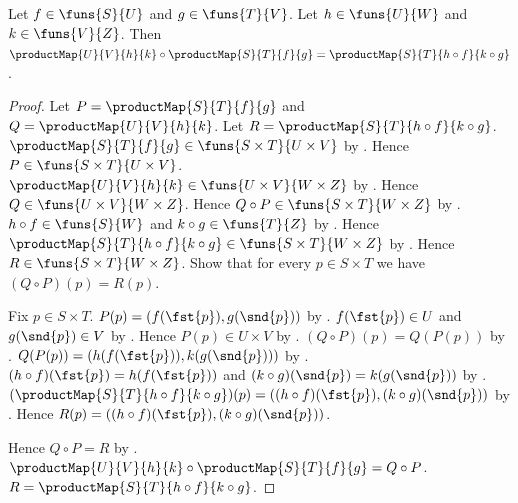 \begin{theorem}\label{composition_product_map}
    Let $f\in\funs{S}{U}$ and $g\in\funs{T}{V}$.
    Let $h\in\funs{U}{W}$ and $k\in\funs{V}{Z}$.
    Then
        $\productMap{U}{V}{h}{k}\circ\productMap{S}{T}{f}{g}
        =\productMap{S}{T}{h\circ f}{k\circ g}$.
\end{theorem}
\begin{proof}
    Let $P=\productMap{S}{T}{f}{g}$ and
        $Q=\productMap{U}{V}{h}{k}$.
    Let $R=\productMap{S}{T}{h\circ f}{k\circ g}$.
    $\productMap{S}{T}{f}{g}\in\funs{S\times T}{U\times V}$ by
        .
    Hence $P\in\funs{S\times T}{U\times V}$.
    $\productMap{U}{V}{h}{k}\in\funs{U\times V}{W\times Z}$ by
        .
    Hence $Q\in\funs{U\times V}{W\times Z}$.
    Hence $Q\circ P\in\funs{S\times T}{W\times Z}$ by
        .
    $h\circ f\in\funs{S}{W}$ and
        $k\circ g\in\funs{T}{Z}$ by .
    Hence $\productMap{S}{T}{h\circ f}{k\circ g}
        \in\funs{S\times T}{W\times Z}$ by .
    Hence $R\in\funs{S\times T}{W\times Z}$.
    Show that for every $p\in S\times T$ we have
        $(Q\circ P)(p)=R(p)$.
    \begin{subproof}
        Fix $p\in S\times T$.
        $P(p)=(f(\fst{p}),g(\snd{p}))$ by
            .
        $f(\fst{p})\in U$ and $g(\snd{p})\in V$ by
            .
        Hence $P(p)\in U\times V$ by .
        $(Q\circ P)(p)=Q(P(p))$ by
            .
        $Q(P(p))=(h(f(\fst{p})),k(g(\snd{p})))$ by
            .
        $(h\circ f)(\fst{p})=h(f(\fst{p}))$ and
            $(k\circ g)(\snd{p})=k(g(\snd{p}))$ by
            .
        $(\productMap{S}{T}{h\circ f}{k\circ g})(p)
            =((h\circ f)(\fst{p}),(k\circ g)(\snd{p}))$ by
            .
        Hence $R(p)=((h\circ f)(\fst{p}),(k\circ g)(\snd{p}))$.
    \end{subproof}
    Hence $Q\circ P=R$ by
        .
    $\productMap{U}{V}{h}{k}\circ\productMap{S}{T}{f}{g}
        =Q\circ P$.
    $R=\productMap{S}{T}{h\circ f}{k\circ g}$.
\end{proof}

